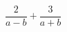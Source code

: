 \begin{ex}[type=expression]
	\begin{condition}
		\( \dfrac{2}{a-b}+\dfrac{3}{a+b} \)
	\end{condition}
\end{ex}